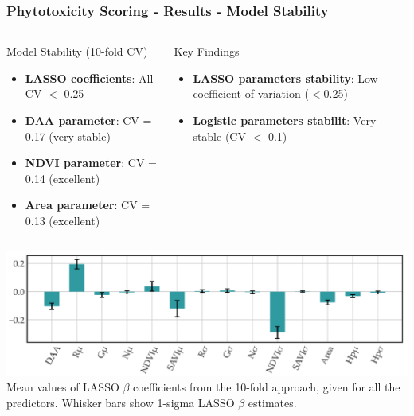 \documentclass[aspectratio=43]{beamer}
\begin{document}
\begin{frame}
    \frametitle{\small Phytotoxicity Scoring - Results - Model Stability}
    \begin{columns}
        \begin{column}{0.5\textwidth}
            \begin{block}{Model Stability (10-fold CV)}
                \scriptsize
                \begin{itemize}
                    \item \textbf{LASSO coefficients}: All CV \ensuremath{<} 0.25
                    \item \textbf{DAA parameter}: CV = 0.17 (very stable)
                    \item \textbf{NDVI parameter}: CV = 0.14 (excellent)
                    \item \textbf{Area parameter}: CV = 0.13 (excellent)
                \end{itemize}
            \end{block}
        \end{column}
        
        \begin{column}{0.5\textwidth}
            \begin{alertblock}{Key Findings}
                \scriptsize
                \begin{itemize}
                    \item \textbf{LASSO parameters stability}: Low coefficient of variation (\ensuremath{<}0.25)
                    \item \textbf{Logistic parameters stabilit}: Very stable (CV \ensuremath{<} 0.1)
                \end{itemize}
            \end{alertblock}
        \end{column}
    \end{columns}
\includegraphics[width=1\textwidth]{Imgs/agronomy-14-00306-g007.png}
\tiny Mean values of LASSO $\beta$ coefficients from the 10-fold approach, given for all the predictors. Whisker bars show 1-sigma LASSO $\beta$ estimates.
\end{frame}
\end{document}
